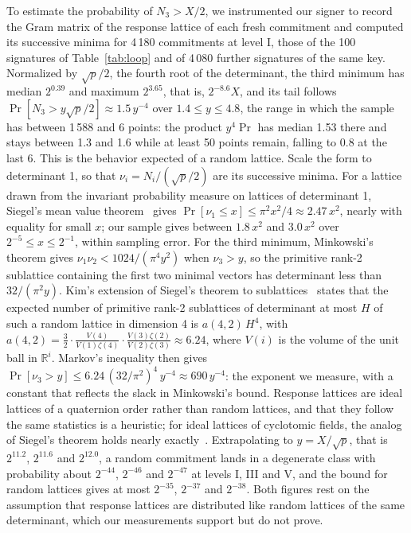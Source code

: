 \documentclass[version=preprint]{iacrcc}
\begin{document}
    To estimate the probability of $N_3 > X/2$, we instrumented our signer to
    record the Gram matrix of the response lattice of each fresh commitment
    and computed its successive minima for 4\,180 commitments at level I,
    those of the 100 signatures of Table~\ref{tab:loop} and of 4\,080 further
    signatures of the same key.
    Normalized by $\sqrt{p}/2$, the fourth root of the determinant, the third
    minimum has median $2^{0.39}$ and maximum $2^{3.65}$, that is, $2^{-8.6}X$,
    and its tail follows $\Pr[N_3 > y\sqrt{p}/2] \approx 1.5\,y^{-4}$
    over $1.4 \le y \le 4.8$, the range in which the sample has between 1\,588
    and 6 points: the product $y^4 \Pr$ has median 1.53 there and stays between
    1.3 and 1.6 while at least 50 points remain, falling to 0.8 at the last 6. This is
    the behavior expected of a random lattice. Scale the form to determinant
    1, so that $\nu_i = N_i/(\sqrt p/2)$ are its successive minima. For a
    lattice drawn from the invariant probability measure on lattices of
    determinant 1, Siegel's mean value theorem~\cite{Sie45} gives
    $\Pr[\nu_1 \le x] \le \pi^2 x^2/4 \approx 2.47\,x^2$, nearly with
    equality for small $x$; our sample gives between $1.8\,x^2$ and
    $3.0\,x^2$ over $2^{-5} \le x \le 2^{-1}$, within sampling error. For the third
    minimum, Minkowski's theorem gives $\nu_1 \nu_2 < 1024/(\pi^4 y^2)$
    when $\nu_3 > y$, so the primitive rank-2 sublattice containing the first
    two minimal vectors has determinant less than $32/(\pi^2 y)$. Kim's
    extension of Siegel's theorem to sublattices~\cite[Theorem 3]{Kim22}
    states that the expected number of primitive rank-2 sublattices of
    determinant at most $H$ of such a random lattice in dimension 4 is
    $a(4, 2)\,H^4$, with $a(4, 2) = \frac{3}{2} \cdot
    \frac{V(4)}{V(1)\zeta(4)} \cdot \frac{V(3)\zeta(2)}{V(2)\zeta(3)}
    \approx 6.24$, where $V(i)$ is the volume of the unit ball in
    $\mathbb{R}^i$. Markov's inequality then gives $\Pr[\nu_3 > y] \le
    6.24\,(32/\pi^2)^4\,y^{-4} \approx 690\,y^{-4}$: the exponent we
    measure, with a constant that reflects the slack in Minkowski's bound.
    Response lattices are ideal lattices of a quaternion order rather than
    random lattices, and that they follow the same statistics is a
    heuristic; for ideal lattices of cyclotomic fields, the analog of Siegel's
    theorem holds nearly exactly~\cite{GV24}. Extrapolating to $y = X/\sqrt p$, that is
    $2^{11.2}$, $2^{11.6}$ and $2^{12.0}$, a random commitment lands in a
    degenerate class with probability about $2^{-44}$, $2^{-46}$ and
    $2^{-47}$ at levels I, III and V, and the bound for random lattices
    gives at most $2^{-35}$, $2^{-37}$ and $2^{-38}$. Both figures rest on
    the assumption that response lattices are distributed like random
    lattices of the same determinant, which our measurements support but do
    not prove.
\end{document}
